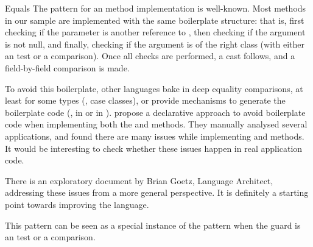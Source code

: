 \begin{pattern}{Equals}
\issues{}
The pattern for an  method implementation is well-known.
Most  methods in our sample are implemented with the same boilerplate structure:
that is, first checking if the parameter is another reference to ,
then checking if the argument is not null,
and finally, checking if the argument is of the right class
(with either an  test or a  comparison).
Once all checks are performed, a cast follows, and a field-by-field comparison is made.

To avoid this boilerplate, other languages bake in deep equality comparisons,
at least for some types (\eg, \scala{} case classes),
or provide mechanisms to generate the boilerplate code (\eg, 
in \haskell{} or \code{\#[derive(Eq)]} in \rust{}).
\cite{vaziriDeclarativeObjectIdentity2007} propose a declarative approach to avoid boilerplate code when implementing
both the  and  methods.
They manually analysed several applications, and found there are many issues while implementing  and  methods.
It would be interesting to check whether these issues happen in real application code.

There is an exploratory document%
by Brian Goetz, \java{} Language Architect,
addressing these issues from a more general perspective.
It is definitely a starting point towards improving the \java{} language.

This pattern can be seen as a special instance of the  pattern when the guard is an  test or a  comparison.

\end{pattern}